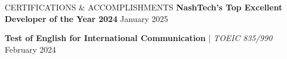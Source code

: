 \begin{rSection}{CERTIFICATIONS \& ACCOMPLISHMENTS}
    \textbf{NashTech's Top Excellent Developer of the Year 2024} \hfill {January 2025}

    \textbf{Test of English for International Communication} | \textit{ TOEIC 835/990 } \hfill {February 2024}
\end{rSection}